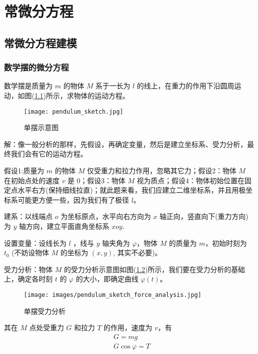 

\chapter{常微分方程}\label{cha:ode}
\section{常微分方程建模}\label{sec:de-ode-modeling}
	\subsection{数学摆的微分方程}
		\label{sub:de-ode-modeling-pendulum}
		数学摆是质量为 $m$ 的物体 $M$ 系于一长为 $l$ 的线上，在重力的作用下沿圆周运动，如图(\ref{fig:单摆示意图})所示，求物体的运动方程。
		\par
		\begin{figure}[H]
		\centering
		\texttt{[image: pendulum\_sketch.jpg]}%
		\caption{单摆示意图}
		\label{fig:单摆示意图}
		\end{figure}
		解：像一般分析的那样，先假设，再确定变量，然后是建立坐标系、受力分析，最终我们会有它的运动方程。
		\par
		假设1:质量为 $m$ 的物体 $M$ 仅受重力和拉力作用，忽略其它力；假设2：物体 $M$ 在初始点处的速度 $v$ 是 0；假设3：物体 $M$ 视为质点；假设4：物体初始位置在固定点水平右方(保持细线拉直)；就此题来看，我们应建立二维坐标系，并且用极坐标系可能更方便一些，因为我们有了极径 $l$。
		\par
		建系：以线端点 $o$ 为坐标原点，水平向右方向为 $x$ 轴正向，竖直向下(重力方向)为 $y$ 轴方向，建立平面直角坐标系 $xoy$.
		\par
		设置变量：设线长为 $l$ ，线与 $y$ 轴夹角为 $\varphi$，物体 $M$ 的质量为 $m$，初始时刻为 $t_0$ (不妨设物体 $M$ 的坐标为 $(x,y)$, 其实不必要)。
		\par
		受力分析：物体 $M$ 的受力分析示意图如图(\ref{fig:单摆受力分析示意图})所示，我们要在受力分析的基础上，确定各时刻 $t$ 的 $\varphi$ 的大小，即确定曲线 $\varphi(t)$。
		 \begin{figure}[H]
		\centering
		\texttt{[image: images/pendulum\_sketch\_force\_analysis.jpg]}%
		\caption{单摆受力分析}
		\label{fig:单摆受力分析示意图}
		\end{figure}
		其在 $M$ 点处受重力 $G$ 和拉力 $T$ 的作用，速度为 $v$，有
		\begin{align*}
			&G = mg \\
			&G \cos{\varphi} = T
		\end{align*}
